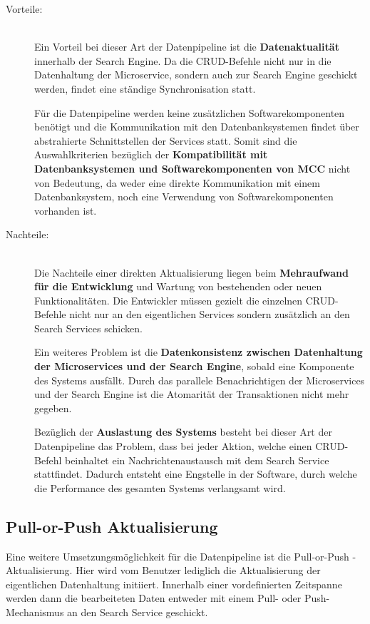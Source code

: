 \begin{description}
    \item[Vorteile:]\hfill \\
    Ein Vorteil bei dieser Art der Datenpipeline ist die \textbf{Datenaktualität} innerhalb der Search Engine. Da die CRUD-Befehle nicht nur in die Datenhaltung der Microservice, sondern auch zur Search Engine geschickt werden, findet eine ständige Synchronisation statt.
    
    Für die Datenpipeline werden keine zusätzlichen Softwarekomponenten benötigt und die Kommunikation mit den Datenbanksystemen findet über abstrahierte Schnittstellen der Services statt. Somit sind die Auswahlkriterien bezüglich der \textbf{Kompatibilität mit Datenbanksystemen und Softwarekomponenten von MCC} nicht von Bedeutung, da weder eine direkte Kommunikation mit einem Datenbanksystem, noch eine Verwendung von Softwarekomponenten vorhanden ist.
    
    \item[Nachteile:]\hfill \\
    Die Nachteile einer direkten Aktualisierung liegen beim \textbf{Mehraufwand für die Entwicklung} und Wartung von bestehenden oder neuen Funktionalitäten. Die Entwickler müssen gezielt die einzelnen CRUD-Befehle nicht nur an den eigentlichen Services sondern zusätzlich an den Search Services schicken.

    Ein weiteres Problem ist die \textbf{Datenkonsistenz zwischen Datenhaltung der Microservices und der Search Engine}, sobald eine Komponente des Systems ausfällt. Durch das parallele Benachrichtigen der Microservices und der Search Engine ist die Atomarität der Transaktionen nicht mehr gegeben.

    Bezüglich der \textbf{Auslastung des Systems} besteht bei dieser Art der Datenpipeline das Problem, dass bei jeder Aktion, welche einen CRUD-Befehl beinhaltet ein Nachrichtenaustausch mit dem Search Service stattfindet. Dadurch entsteht eine Engstelle in der Software, durch welche die Performance des gesamten Systems verlangsamt wird.

\end{description}

\subsection{Pull-or-Push Aktualisierung\label{subsec4.3.3:Unterunterpunkt-3}}

Eine weitere Umsetzungsmöglichkeit für die Datenpipeline ist die \glqq Pull-or-Push\grqq{} - Aktualisierung. Hier wird vom Benutzer lediglich die Aktualisierung der eigentlichen Datenhaltung initiiert. Innerhalb einer vordefinierten Zeitspanne werden dann die bearbeiteten Daten entweder mit einem Pull- oder Push-Mechanismus an den Search Service geschickt.

